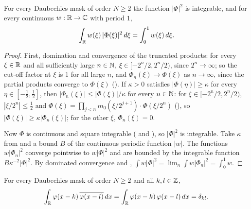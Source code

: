 \begin{proposition}
\label{prop:daub-periodic-integral}
\leanok
{}
For every Daubechies mask of order $N \geq 2$ the function $|\Phi|^2$ is integrable, and for
every continuous $w : \mathbb{R} \to \mathbb{C}$ with period $1$,
\[
  \int_{\mathbb{R}} w(\xi) \, |\Phi(\xi)|^2 \, d\xi = \int_0^1 w(\xi) \, d\xi .
\]
\end{proposition}

\begin{proof}
\leanok
{}
First, domination and convergence of the truncated products: for every $\xi \in \mathbb{R}$ and all
sufficiently large $n \in \mathbb{N}$, $\xi \in [-2^n/2, 2^n/2)$, since $2^n \to \infty$; so the cut-off
factor at $\xi$ is $1$ for all large $n$, and $\Phi_n(\xi) \to \Phi(\xi)$ as $n \to \infty$,
since the partial products converge to $\Phi(\xi)$ ().
If $\kappa > 0$ satisfies $|\Phi(\eta)| \geq \kappa$ for every $\eta \in [-\frac12, \frac12]$,
then $|\Phi_n(\xi)| \leq |\Phi(\xi)|/\kappa$ for every $n \in \mathbb{N}$: for
$\xi \in [-2^n/2, 2^n/2)$, $|\xi/2^n| \leq \frac12$ and
$\Phi(\xi) = \prod_{j<n} m_0(\xi/2^{j+1}) \cdot \Phi(\xi/2^n)$
(), so $|\Phi(\xi)| \geq \kappa |\Phi_n(\xi)|$; for the
other $\xi$, $\Phi_n(\xi) = 0$.

Now $\Phi$ is continuous and square integrable
( and ), so
$|\Phi|^2$ is integrable. Take $\kappa$ from  and a bound $B$
of the continuous periodic function $|w|$. The functions $w |\Phi_n|^2$ converge pointwise to
$w |\Phi|^2$ and are bounded by the integrable function $B \kappa^{-2} |\Phi|^2$. By dominated
convergence and ,
$\int w |\Phi|^2 = \lim_n \int w |\Phi_n|^2 = \int_0^1 w$.
\end{proof}

\begin{theorem}
\label{thm:daub-orthonormal}
\leanok
{}
For every Daubechies mask of order $N \geq 2$ and all $k, l \in \mathbb{Z}$,
\[
  \int_{\mathbb{R}} \varphi(x - k) \, \overline{\varphi(x - l)} \, dx
  = \int_{\mathbb{R}} \varphi(x - k) \, \varphi(x - l) \, dx = \delta_{kl} .
\]
\end{theorem}

